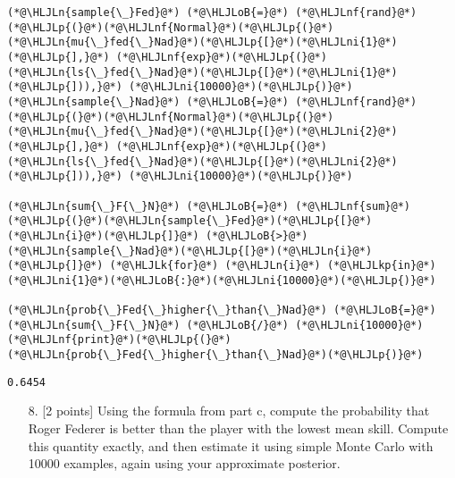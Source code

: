\documentclass[12pt,a4paper]{article}
\newcommand{\HLJLk}[1]{\textcolor[RGB]{148,91,176}{\textbf{#1}}}
\newcommand{\HLJLkp}[1]{\textcolor[RGB]{148,91,176}{\textbf{#1}}}
\newcommand{\HLJLn}[1]{#1}
\newcommand{\HLJLnf}[1]{\textcolor[RGB]{66,102,213}{#1}}
\newcommand{\HLJLni}[1]{\textcolor[RGB]{59,151,46}{#1}}
\newcommand{\HLJLoB}[1]{\textcolor[RGB]{102,102,102}{\textbf{#1}}}
\newcommand{\HLJLp}[1]{#1}
\begin{document}
\begin{lstlisting}
(*@\HLJLn{sample{\_}Fed}@*) (*@\HLJLoB{=}@*) (*@\HLJLnf{rand}@*)(*@\HLJLp{(}@*)(*@\HLJLnf{Normal}@*)(*@\HLJLp{(}@*)(*@\HLJLn{mu{\_}fed{\_}Nad}@*)(*@\HLJLp{[}@*)(*@\HLJLni{1}@*)(*@\HLJLp{],}@*) (*@\HLJLnf{exp}@*)(*@\HLJLp{(}@*)(*@\HLJLn{ls{\_}fed{\_}Nad}@*)(*@\HLJLp{[}@*)(*@\HLJLni{1}@*)(*@\HLJLp{])),}@*) (*@\HLJLni{10000}@*)(*@\HLJLp{)}@*)
(*@\HLJLn{sample{\_}Nad}@*) (*@\HLJLoB{=}@*) (*@\HLJLnf{rand}@*)(*@\HLJLp{(}@*)(*@\HLJLnf{Normal}@*)(*@\HLJLp{(}@*)(*@\HLJLn{mu{\_}fed{\_}Nad}@*)(*@\HLJLp{[}@*)(*@\HLJLni{2}@*)(*@\HLJLp{],}@*) (*@\HLJLnf{exp}@*)(*@\HLJLp{(}@*)(*@\HLJLn{ls{\_}fed{\_}Nad}@*)(*@\HLJLp{[}@*)(*@\HLJLni{2}@*)(*@\HLJLp{])),}@*) (*@\HLJLni{10000}@*)(*@\HLJLp{)}@*)

(*@\HLJLn{sum{\_}F{\_}N}@*) (*@\HLJLoB{=}@*) (*@\HLJLnf{sum}@*)(*@\HLJLp{(}@*)(*@\HLJLn{sample{\_}Fed}@*)(*@\HLJLp{[}@*)(*@\HLJLn{i}@*)(*@\HLJLp{]}@*) (*@\HLJLoB{>}@*) (*@\HLJLn{sample{\_}Nad}@*)(*@\HLJLp{[}@*)(*@\HLJLn{i}@*)(*@\HLJLp{]}@*) (*@\HLJLk{for}@*) (*@\HLJLn{i}@*) (*@\HLJLkp{in}@*) (*@\HLJLni{1}@*)(*@\HLJLoB{:}@*)(*@\HLJLni{10000}@*)(*@\HLJLp{)}@*)

(*@\HLJLn{prob{\_}Fed{\_}higher{\_}than{\_}Nad}@*) (*@\HLJLoB{=}@*) (*@\HLJLn{sum{\_}F{\_}N}@*) (*@\HLJLoB{/}@*) (*@\HLJLni{10000}@*)
(*@\HLJLnf{print}@*)(*@\HLJLp{(}@*)(*@\HLJLn{prob{\_}Fed{\_}higher{\_}than{\_}Nad}@*)(*@\HLJLp{)}@*)
\end{lstlisting}

\begin{lstlisting}
0.6454
\end{lstlisting}


\begin{itemize}
\item[8. ] [2 points] Using the formula from part c, compute the probability that Roger Federer is better than the player with the lowest mean skill. Compute this quantity exactly, and then estimate it using simple Monte Carlo with 10000 examples, again using your approximate posterior.

\end{itemize}
\end{document}
